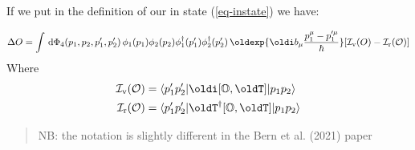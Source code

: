 \documentclass[
  letterpaper,
  DIV=11,
  numbers=noendperiod,
  oneside]{scrreprt}
\begin{document}
If we put in the definition of our in state (\ref{eq-instate}) we have:

\[\Delta O = \int \,\mathtip{\mathrm{d}\Phi_{4}(p_1,p_2,p_1',p_2')}{\text{On shell integration measure: } \mathrm{d}\Phi(p_i)=\,\mathtip{\tilde{\mathrm{d}}^{4}p_i}{\tilde{\mathrm{d}}^{4}p_i=\frac{\,\mathrm{d}^{4}p_i\,}{(2\pi)^{4}}}\,\mathtip{\tilde{\delta}^{(+)}\left(p_i^2-m_i^2\right)}{\text{Normalized positive energy delta function: }\tilde{\delta}^{(+)}\left(p_i^2-m_i^2\right)=\texttip{\delta^{(+)}\left(p_i^2-m_i^2\right)}{Dirac delta function} 2\pi= 2 \pi \texttip{\delta^{()}\left(p_i^2 -m_i^2\right)}{Dirac delta function}\texttip{\Theta^{()}\left(p_i^0\right)}{Heaviside step function}}}\, \phi_1(p_1)\phi_2(p_2)\phi_1^\dagger(p_1')\phi_2^\dagger(p_2')\,\oldexp{\oldi b_\mu\frac{p_1^\mu-p_1'^\mu}{\hbar}}[\mathcal{I_\text{v}}(O)-\mathtip{\mathcal{I}_{\text{r}}(\mathtip{\mathcal{O}}{\text{Observable: }\mathcal{O}})}{\text{Real integrand: }\mathcal{I}_{\text{r}}(\mathtip{\mathcal{O}}{\text{Observable: }\mathcal{O}})} ]\]
Where \[\begin{aligned}
\mathtip{\mathcal{I}_{\text{v}}(\mathtip{\mathcal{O}}{\text{Observable: }\mathcal{O}})}{\text{Virtual integrand: }\mathcal{I}_{\text{v}}(\mathtip{\mathcal{O}}{\text{Observable: }\mathcal{O}})}&=\mathtip{\langle p_1'p_2' \vert \oldi\mathtip{[\mathtip{\mathbb{O}}{\text{Operator: }\mathbb{O}},\oldT]}{\text{Commutator: }[\mathtip{\mathbb{O}}{\text{Operator: }\mathbb{O}},\oldT]} \vert p_1p_2 \rangle}{\text{Matrix element: }\langle p_1'p_2' \vert \oldi\mathtip{[\mathtip{\mathbb{O}}{\text{Operator: }\mathbb{O}},\oldT]}{\text{Commutator: }[\mathtip{\mathbb{O}}{\text{Operator: }\mathbb{O}},\oldT]} \vert p_1p_2 \rangle}\\
\mathtip{\mathcal{I}_{\text{r}}(\mathtip{\mathcal{O}}{\text{Observable: }\mathcal{O}})}{\text{Real integrand: }\mathcal{I}_{\text{r}}(\mathtip{\mathcal{O}}{\text{Observable: }\mathcal{O}})}&=\mathtip{\langle p_1'p_2' \vert \oldT^\dagger\mathtip{[\mathtip{\mathbb{O}}{\text{Operator: }\mathbb{O}},\oldT]}{\text{Commutator: }[\mathtip{\mathbb{O}}{\text{Operator: }\mathbb{O}},\oldT]} \vert p_1p_2 \rangle}{\text{Matrix element: }\langle p_1'p_2' \vert \oldT^\dagger\mathtip{[\mathtip{\mathbb{O}}{\text{Operator: }\mathbb{O}},\oldT]}{\text{Commutator: }[\mathtip{\mathbb{O}}{\text{Operator: }\mathbb{O}},\oldT]} \vert p_1p_2 \rangle}
\end{aligned}\]

\begin{quote}
NB: the notation is slightly different in the Bern et al.
(2021)
paper
\end{quote}
\end{document}
